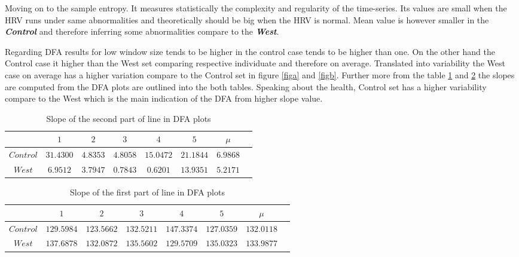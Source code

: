 Moving on to the sample entropy. It measures statistically the complexity and regularity of the time-series. Its values are small when the HRV runs under same abnormalities and theoretically should be big when the HRV is normal. Mean value is however smaller in the \textbf{\textit{Control}} and therefore inferring some abnormalities compare to the \textbf{\textit{West}}.    
  
Regarding DFA results for low window size tends to be higher in the control case tends to be higher than one. On the other hand the Control case it higher than the West set comparing respective individuate and therefore on average. Translated into variability the West case on average has a higher variation compare to the Control set in figure \ref{figa} and \ref{figb}. Further more from the table \ref{a2} and \ref{a1} the slopes are computed from the DFA plots are outlined into the both tables. Speaking about the health, Control set has a higher variability compare to the West which is the main indication of the DFA from higher slope value.  
    
    




\begin{table}[!htbp]
\centering
\caption{Slope of the second part of line in DFA plots}\label{a2}
\begin{tabular}{ c c c c c c c c} 
\hline
&$1$&$2$&$3$&$4$&$5$&$\mu$\\
\hline
$Control$&$31.4300$&$ 4.8353$&$4.8058$&$15.0472$&$21.1844$&$6.9868$\\
$West$&$6.9512$&$ 3.7947$&$0.7843$&$ 0.6201$&$13.9351$&$5.2171$\\
\hline 
\end{tabular}
\end{table}





\begin{table}[!htbp]
\centering
\caption{Slope of the first part of line in DFA plots}\label{a1}
\begin{tabular}{ c c c c c c c c} 
\hline
&$1$&$2$&$3$&$4$&$5$&$\mu$\\
\hline
$Control$&$129.5984$&$123.5662$&$132.5211$&$147.3374$&$127.0359$&$132.0118$\\
$West$&$137.6878$&$132.0872$&$135.5602$&$129.5709$&$135.0323$&$133.9877$\\
\hline 
\end{tabular}
\end{table}



